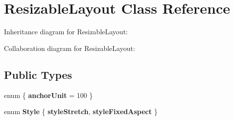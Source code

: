 \hypertarget{class_resizable_layout}{}\section{Resizable\+Layout Class Reference}
\label{class_resizable_layout}


Inheritance diagram for Resizable\+Layout\+:


Collaboration diagram for Resizable\+Layout\+:
\subsection*{Public Types}
\begin{DoxyCompactItemize}
\item 
enum \{ {\bfseries anchor\+Unit} = 100
 \}\hypertarget{class_resizable_layout_ab060b861a48a7de097545c90518e57d9}{}\label{class_resizable_layout_ab060b861a48a7de097545c90518e57d9}

\item 
enum {\bfseries Style} \{ {\bfseries style\+Stretch}, 
{\bfseries style\+Fixed\+Aspect}
 \}\hypertarget{class_resizable_layout_aff762c8fee36d1ee99283fac47eaf9a8}{}\label{class_resizable_layout_aff762c8fee36d1ee99283fac47eaf9a8}

\end{DoxyCompactItemize}
